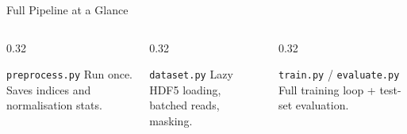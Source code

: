 \documentclass[aspectratio=169, 10pt]{beamer}
\begin{document}
\begin{frame}{Full Pipeline at a Glance}
\vspace{4pt}
\begin{columns}
  \begin{column}{0.32\textwidth}
    \begin{block}{\small \texttt{preprocess.py}}
      \footnotesize
      Run once. Saves indices and normalisation stats.
    \end{block}
  \end{column}
  \begin{column}{0.32\textwidth}
    \begin{block}{\small \texttt{dataset.py}}
      \footnotesize
      Lazy HDF5 loading, batched reads, masking.
    \end{block}
  \end{column}
  \begin{column}{0.32\textwidth}
    \begin{block}{\small \texttt{train.py} / \texttt{evaluate.py}}
      \footnotesize
      Full training loop + test-set evaluation.
    \end{block}
  \end{column}
\end{columns}
\end{frame}
\end{document}
